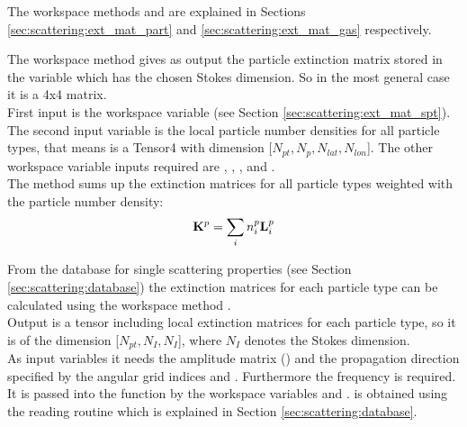\vspace{2ex}
\noindent
The workspace methods  and
 are explained in Sections
\ref{sec:scattering:ext_mat_part} and \ref{sec:scattering:ext_mat_gas}
respectively.

\label{sec:scattering:ext_mat_part}

The workspace method  gives as output the
particle extinction matrix  stored in the variable
 which has the chosen Stokes dimension. So in
the most general case it is a 4x4 matrix.\\
First input is the workspace variable  (see Section
\ref{sec:scattering:ext_mat_spt}). The second input variable is the
local particle number densities  for all particle types,
that means  is a Tensor4 with dimension 
[$N_{pt}, N_{p}, N_{lat}, N_{lon}$]. The other workspace variable
inputs required are , ,
, and . \\
The method sums up the extinction matrices for all particle types
weighted with the particle number density:
\begin{eqnarray}
  {\bf K}^{p} = \sum_i n^p_i {\bf L}^{p}_i 
\end{eqnarray}


\label{sec:scattering:ext_mat_gas}

\label{sec:scattering:ext_mat_spt}

From the database for single scattering properties (see Section 
\ref{sec:scattering:database}) the extinction matrices for each
particle type can be calculated using the workspace method
.\\
Output is a tensor including local extinction matrices for each
particle type, so it is of the dimension [$N_{pt}, N_{I}, N_{I}$],
where $N_{I}$ denotes the Stokes dimension.\\
As input variables it needs the amplitude matrix ()
and the propagation direction specified by the angular grid indices
 and . Furthermore the
frequency is required. It is passed into the function by the workspace
variables  and .
 is
obtained using the reading routine  which is
explained in Section \ref{sec:scattering:database}.


